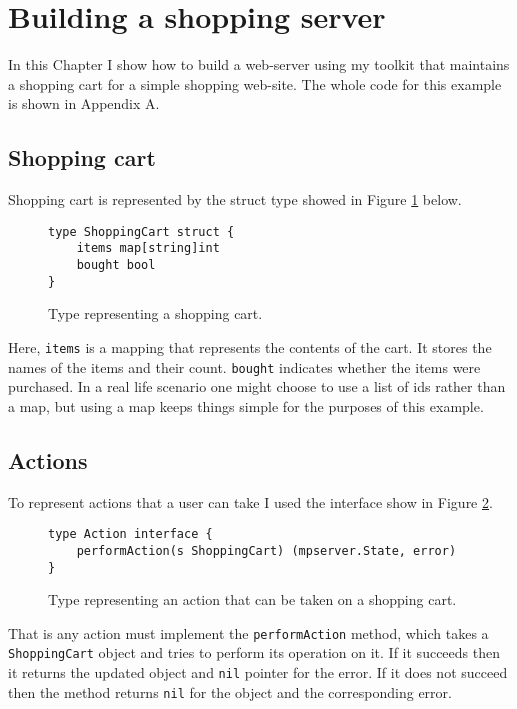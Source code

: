 \section{Building a shopping server}
\label{sec:shopping}
In this Chapter I show how to build a web-server using my toolkit that
maintains a shopping cart for a simple shopping web-site. The whole 
code for this example is shown in Appendix A.

\subsection{Shopping cart}
Shopping cart is represented by the struct type showed in Figure 
\ref{fig:shoppingCart} below.
\begin{figure}[h]
\begin{lstlisting}
type ShoppingCart struct {
    items map[string]int
    bought bool
}
\end{lstlisting}
\caption[scale=1.0]{Type representing a shopping cart.}
\label{fig:shoppingCart}
\end{figure}

Here, \texttt{items} is 
a mapping that represents the contents of the cart. It stores the names
of the items and their count. \texttt{bought} indicates whether the items
were purchased. In a real life scenario one might choose to use 
a list of ids rather than a map, but using a map keeps things simple
for the purposes of this example.

\subsection{Actions}
To represent actions that a user can take I used the interface show in 
Figure \ref{fig:action}.
\begin{figure}[h]
\begin{lstlisting}
type Action interface {
    performAction(s ShoppingCart) (mpserver.State, error)
}
\end{lstlisting}
\caption[scale=1.0]{Type representing an action that can be taken on 
a shopping cart.}
\label{fig:action}
\end{figure}
That is any action must implement the \texttt{performAction} method, which takes
a \texttt{ShoppingCart} object and tries to perform its operation on it. If
it succeeds then it returns the updated object and \texttt{nil} pointer for the
error. If it does not succeed then the method returns \texttt{nil} for the
object and the corresponding error.

